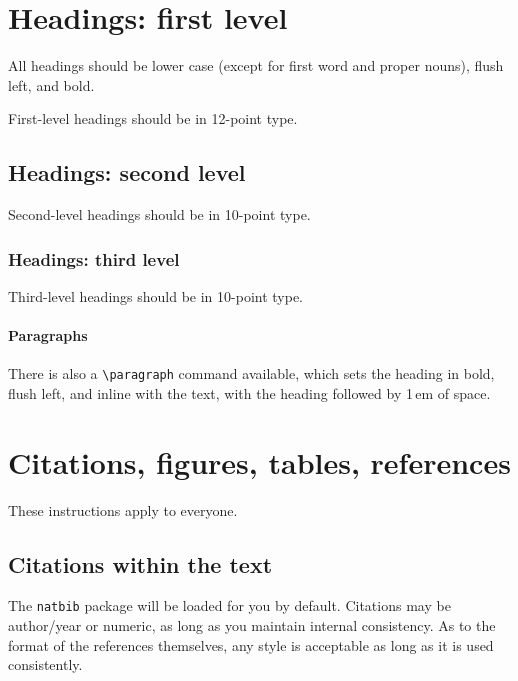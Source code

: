 \documentclass{article}
\begin{document}
\newpage
\section{Headings: first level}
\label{headings}

All headings should be lower case (except for first word and proper nouns),
flush left, and bold.

First-level headings should be in 12-point type.

\subsection{Headings: second level}

Second-level headings should be in 10-point type.

\subsubsection{Headings: third level}

Third-level headings should be in 10-point type.

\paragraph{Paragraphs}

There is also a \verb+\paragraph+ command available, which sets the heading in
bold, flush left, and inline with the text, with the heading followed by 1\,em
of space.

\section{Citations, figures, tables, references}
\label{others}

These instructions apply to everyone.

\subsection{Citations within the text}

The \verb+natbib+ package will be loaded for you by default.  Citations may be
author/year or numeric, as long as you maintain internal consistency.  As to the
format of the references themselves, any style is acceptable as long as it is
used consistently.
\end{document}
